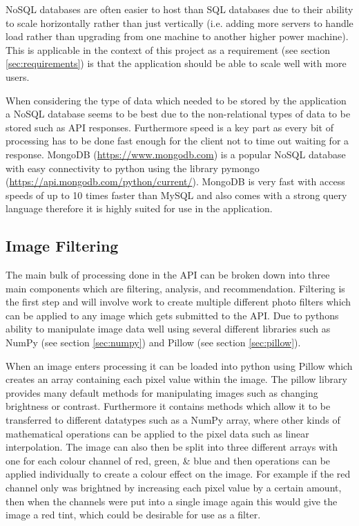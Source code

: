 \documentclass[a4paper,12pt]{report}
\begin{document}
        NoSQL databases are often easier to host than SQL databases due to their ability to scale horizontally \citep{cattell2011scalable} rather than just vertically (i.e. adding more servers to handle load rather than upgrading from one machine to another higher power machine). This is applicable in the context of this project as a requirement (see section \ref{sec:requirements}) is that the application should be able to scale well with more users.

        When considering the type of data which needed to be stored by the application a NoSQL database seems to be best due to the non-relational types of data to be stored such as API responses. Furthermore speed is a key part as every bit of processing has to be done fast enough for the client not to time out waiting for a response. MongoDB (\url{https://www.mongodb.com}) is a popular NoSQL database with easy connectivity to python using the library pymongo (\url{https://api.mongodb.com/python/current/}). MongoDB is very fast with access speeds of up to 10 times faster than MySQL \citep{han2011survey} and also comes with a strong query language therefore it is highly suited for use in the application.

      \subsection{Image Filtering}
        The main bulk of processing done in the API can be broken down into three main components which are filtering, analysis, and recommendation. Filtering is the first step and will involve work to create multiple different photo filters which can be applied to any image which gets submitted to the API. Due to pythons ability to manipulate image data well using several different libraries such as NumPy (see section \ref{sec:numpy}) and Pillow (see section \ref{sec:pillow}).

        When an image enters processing it can be loaded into python using Pillow which creates an array containing each pixel value within the image. The pillow library provides many default methods for manipulating images such as changing brightness or contrast. Furthermore it contains methods which allow it to be transferred to different datatypes such as a NumPy array, where other kinds of mathematical operations can be applied to the pixel data such as linear interpolation. The image can also then be split into three different arrays with one for each colour channel of red, green, \& blue and then operations can be applied individually to create a colour effect on the image. For example if the red channel only was brightned by increasing each pixel value by a certain amount, then when the channels were put into a single image again this would give the image a red tint, which could be desirable for use as a filter.
\end{document}
